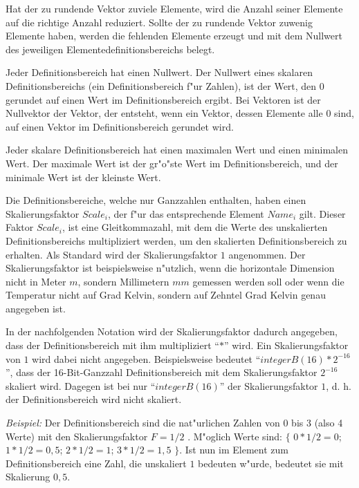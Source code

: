 Hat der zu rundende Vektor zuviele Elemente, wird die Anzahl seiner Elemente auf die richtige Anzahl reduziert. Sollte der zu rundende Vektor zuwenig Elemente haben, werden die fehlenden Elemente erzeugt und mit dem Nullwert des jeweiligen Elementedefinitionsbereichs belegt.

Jeder Definitionsbereich hat einen Nullwert. Der Nullwert eines skalaren Definitionsbereichs (ein Definitionsbereich f"ur Zahlen), ist der Wert, den $0$ gerundet auf einen Wert im Definitionsbereich ergibt.
Bei Vektoren ist der Nullvektor der Vektor, der entsteht, wenn ein Vektor, dessen Elemente alle $0$ sind, auf einen Vektor im Definitionsbereich gerundet wird.

Jeder skalare Definitionsbereich hat einen maximalen Wert und einen minimalen Wert. Der maximale Wert ist der gr"o"ste Wert im Definitionsbereich, und der minimale Wert ist der kleinste Wert.

\bigskip\noindent
Die Definitionsbereiche, welche nur Ganzzahlen enthalten, haben einen Skalierungsfaktor $Scale_i$, der f"ur das entsprechende Element $Name_i$ gilt. Dieser Faktor $Scale_i$, ist eine Gleitkommazahl, mit dem die Werte des unskalierten Definitionsbereichs multipliziert werden, um den skalierten Definitionsbereich zu erhalten. Als Standard wird der Skalierungsfaktor $1$ angenommen. Der Skalierungsfaktor ist beispielsweise n"utzlich, wenn die horizontale Dimension nicht in Meter $m$, sondern Millimetern $mm$ gemessen werden soll oder wenn die Temperatur nicht auf Grad Kelvin, sondern auf Zehntel Grad Kelvin genau angegeben ist.

In der nachfolgenden Notation wird der Skalierungsfaktor dadurch angegeben, dass der Definitionsbereich mit ihm multipliziert ``$*$'' wird. Ein Skalierungsfaktor von $1$ wird dabei nicht angegeben. Beispielsweise bedeutet ``$integerB(16) * 2^{-16}$'', dass der 16-Bit-Ganzzahl Definitionsbereich mit dem Skalierungsfaktor $2^{-16}$ skaliert wird. Dagegen ist bei nur ``$integerB(16)$'' der Skalierungsfaktor $1$, d. h. der Definitionsbereich wird nicht skaliert.

\noindent
\textit{Beispiel:} Der Definitionsbereich sind die nat"urlichen Zahlen von $0$ bis $3$ (also 4 Werte) mit den Skalierungsfaktor $F=1/2$ . M"oglich Werte sind: $\{$ $0*1/2=0$; $1*1/2=0{,}5$; $2*1/2=1$; $3*1/2=1{,}5$ $\}$. Ist nun im Element zum Definitionsbereich eine Zahl, die unskaliert $1$ bedeuten w"urde, bedeutet sie mit Skalierung $0{,}5$.


